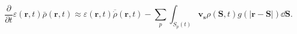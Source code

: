 \begin{equation}
\frac{\partial}{\partial t}\varepsilon (\mathbf{r},t) \bar{\rho}(\mathbf{r},t) 
\approx
\varepsilon (\mathbf{r},t) \overline{\dot{\rho}}(\mathbf{r},t) - 
\sum_{p}{\int_{S_p(t)}{\mathbf{v_s} \rho(\mathbf{S},t) g(|\mathbf{r} - \mathbf{S}|) 
\dd \mathbf{S}}}.
 \label{eq:ddtepsrho}
\end{equation}
